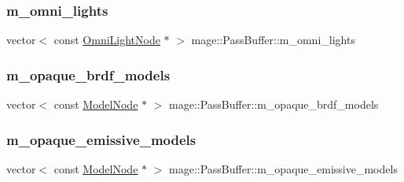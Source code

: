 \hypertarget{structmage_1_1_pass_buffer_ab4553bc8afe80eff1f52d511cd23e90b}{}\label{structmage_1_1_pass_buffer_ab4553bc8afe80eff1f52d511cd23e90b} 
\subsubsection{\texorpdfstring{m\+\_\+omni\+\_\+lights}{m\_omni\_lights}}
{\footnotesize\ttfamily vector$<$ const \hyperlink{namespacemage_a1724c6e6b6b5ba535cdd967cbbb4a669}{Omni\+Light\+Node} $\ast$ $>$ mage\+::\+Pass\+Buffer\+::m\+\_\+omni\+\_\+lights}

\hypertarget{structmage_1_1_pass_buffer_a7b866f3637755bfb2d951fe8a3495bea}{}\label{structmage_1_1_pass_buffer_a7b866f3637755bfb2d951fe8a3495bea} 
\subsubsection{\texorpdfstring{m\+\_\+opaque\+\_\+brdf\+\_\+models}{m\_opaque\_brdf\_models}}
{\footnotesize\ttfamily vector$<$ const \hyperlink{classmage_1_1_model_node}{Model\+Node} $\ast$ $>$ mage\+::\+Pass\+Buffer\+::m\+\_\+opaque\+\_\+brdf\+\_\+models}

\hypertarget{structmage_1_1_pass_buffer_a6a2c8f757aca5b28eda0bec25f412e05}{}\label{structmage_1_1_pass_buffer_a6a2c8f757aca5b28eda0bec25f412e05} 
\subsubsection{\texorpdfstring{m\+\_\+opaque\+\_\+emissive\+\_\+models}{m\_opaque\_emissive\_models}}
{\footnotesize\ttfamily vector$<$ const \hyperlink{classmage_1_1_model_node}{Model\+Node} $\ast$ $>$ mage\+::\+Pass\+Buffer\+::m\+\_\+opaque\+\_\+emissive\+\_\+models}

\hypertarget{structmage_1_1_pass_buffer_a45b9dd8e0ecb9c0110b53a5a744519bb}{}\label{structmage_1_1_pass_buffer_a45b9dd8e0ecb9c0110b53a5a744519bb} 
